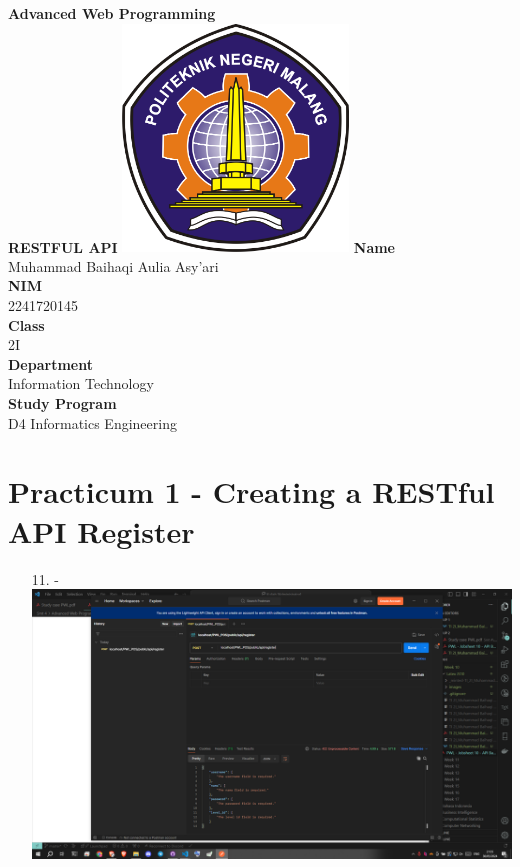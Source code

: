 \documentclass[12pt,titlepage]{article}
\newcommand{\vSubject}{Advanced Web Programming}
\newcommand{\vSubtitle}{RESTFUL API}
\newcommand{\vName}{Muhammad Baihaqi Aulia Asy'ari}
\newcommand{\vNIM}{2241720145}
\newcommand{\vClass}{2I}
\newcommand{\vDepartment}{Information Technology}
\newcommand{\vStudyProgram}{D4 Informatics Engineering}
\begin{document}
\begin{titlepage}
    \centering
    \vfill
    {\bfseries\LARGE
        \vSubject\\
        \vskip0.25cm
        \vSubtitle
    }
    \vfill
    \includegraphics[width=6cm]{images/polinema-logo.png}
    \vfill
    {
        \textbf{Name}\\
        \vName\\
        \vskip0.5cm
        \textbf{NIM}\\
        \vNIM\\
        \vskip0.5cm
        \textbf{Class}\\
        \vClass\\
        \vskip0.5cm
        \textbf{Department}\\
        \vDepartment\\
        \vskip0.5cm
        \textbf{Study Program}\\
        \vStudyProgram
    }
\end{titlepage}
\newpage
\section{Practicum 1 - Creating a RESTful API Register}
\begin{enumerate}
    \item[11.] - \\ \includegraphics[width=.9\textwidth]{images/figures/Screenshot (474).png}
\end{enumerate}
\end{document}
